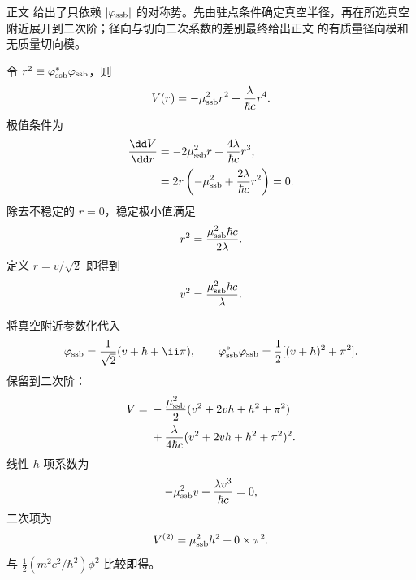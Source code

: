 \begin{derivation}[对称破缺后的径向与角向质量]

正文 给出了只依赖 \(|\varphi_{\rm ssb}|\) 的对称势。先由驻点条件确定真空半径，再在所选真空附近展开到二次阶；径向与切向二次系数的差别最终给出正文 的有质量径向模和无质量切向模。


令 \(r^2\equiv\varphi_{\rm ssb}^*\varphi_{\rm ssb}\)，则
\begin{equation*}
 V(r)=-\mu_{\rm ssb}^2r^2+\frac\lambda{\hbar c}r^4.
\end{equation*}
极值条件为
\begin{align*}
 \frac{\dd V}{\dd r}
 &=-2\mu_{\rm ssb}^2r+\frac{4\lambda}{\hbar c}r^3,\\
 &=2r\left(-\mu_{\rm ssb}^2+\frac{2\lambda}{\hbar c}r^2\right)=0.
\end{align*}
除去不稳定的 \(r=0\)，稳定极小值满足
\begin{equation*}
 r^2=\frac{\mu_{\rm ssb}^2\hbar c}{2\lambda}.
\end{equation*}
定义 \(r=v/\sqrt2\) 即得到
\begin{equation*}
 v^2=\frac{\mu_{\rm ssb}^2\hbar c}{\lambda}.
\end{equation*}

将真空附近参数化代入
\begin{equation*}
 \varphi_{\rm ssb}=\frac1{\sqrt2}(v+h+\ii\pi),
 \qquad
 \varphi_{\rm ssb}^*\varphi_{\rm ssb}=\frac12[(v+h)^2+\pi^2].
\end{equation*}
保留到二次阶：
\begin{align*}
 V
 ={}&-\frac{\mu_{\rm ssb}^2}{2}
 (v^2+2vh+h^2+\pi^2)\\
 &+\frac\lambda{4\hbar c}
 (v^2+2vh+h^2+\pi^2)^2.
\end{align*}
线性 \(h\) 项系数为
\begin{equation*}
 -\mu_{\rm ssb}^2v+\frac{\lambda v^3}{\hbar c}=0,
\end{equation*}
二次项为
\begin{equation*}
 V^{(2)}=\mu_{\rm ssb}^2h^2+0\times\pi^2.
\end{equation*}
与 \(\tfrac12(m^2c^2/\hbar^2)\phi^2\) 比较即得。
\end{derivation}

